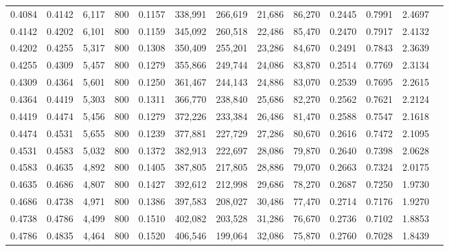 \begin{tabular}{rrrrrrrrrrrrr}
0.4084 & 0.4142 &  6,117 &   800 &                                     0.1157 & 338,991 & 266,619 &  21,686 &  86,270 & 0.2445 & 0.7991 & 2.4697 \\
0.4142 & 0.4202 &  6,101 &   800 &                                     0.1159 & 345,092 & 260,518 &  22,486 &  85,470 & 0.2470 & 0.7917 & 2.4132 \\
0.4202 & 0.4255 &  5,317 &   800 &                                     0.1308 & 350,409 & 255,201 &  23,286 &  84,670 & 0.2491 & 0.7843 & 2.3639 \\
0.4255 & 0.4309 &  5,457 &   800 &                                     0.1279 & 355,866 & 249,744 &  24,086 &  83,870 & 0.2514 & 0.7769 & 2.3134 \\
0.4309 & 0.4364 &  5,601 &   800 &                                     0.1250 & 361,467 & 244,143 &  24,886 &  83,070 & 0.2539 & 0.7695 & 2.2615 \\
0.4364 & 0.4419 &  5,303 &   800 &                                     0.1311 & 366,770 & 238,840 &  25,686 &  82,270 & 0.2562 & 0.7621 & 2.2124 \\
0.4419 & 0.4474 &  5,456 &   800 &                                     0.1279 & 372,226 & 233,384 &  26,486 &  81,470 & 0.2588 & 0.7547 & 2.1618 \\
0.4474 & 0.4531 &  5,655 &   800 &                                     0.1239 & 377,881 & 227,729 &  27,286 &  80,670 & 0.2616 & 0.7472 & 2.1095 \\
0.4531 & 0.4583 &  5,032 &   800 &                                     0.1372 & 382,913 & 222,697 &  28,086 &  79,870 & 0.2640 & 0.7398 & 2.0628 \\
0.4583 & 0.4635 &  4,892 &   800 &                                     0.1405 & 387,805 & 217,805 &  28,886 &  79,070 & 0.2663 & 0.7324 & 2.0175 \\
0.4635 & 0.4686 &  4,807 &   800 &                                     0.1427 & 392,612 & 212,998 &  29,686 &  78,270 & 0.2687 & 0.7250 & 1.9730 \\
0.4686 & 0.4738 &  4,971 &   800 &                                     0.1386 & 397,583 & 208,027 &  30,486 &  77,470 & 0.2714 & 0.7176 & 1.9270 \\
0.4738 & 0.4786 &  4,499 &   800 &                                     0.1510 & 402,082 & 203,528 &  31,286 &  76,670 & 0.2736 & 0.7102 & 1.8853 \\
0.4786 & 0.4835 &  4,464 &   800 &                                     0.1520 & 406,546 & 199,064 &  32,086 &  75,870 & 0.2760 & 0.7028 & 1.8439 \\

\end{tabular}
